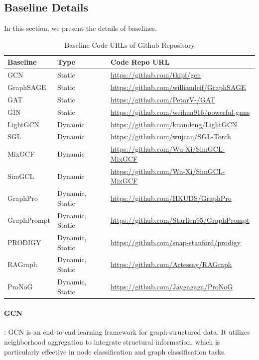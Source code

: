 \subsection{Baseline Details}

In this section, we present the details of baselines.

\begin{table}[h!]
\centering
\renewcommand{\arraystretch}{1.2}
\setlength{\tabcolsep}{8pt}
\footnotesize
\caption{Baseline Code URLs of Github Repository}
\label{tab:baseline_urls}
\begin{tabular}{l l l}
\toprule
\textbf{Baseline} & \textbf{Type} & \textbf{Code Repo URL} \\
\midrule
GCN              & Static        & \url{https://github.com/tkipf/gcn} \\
GraphSAGE        & Static        & \url{https://github.com/williamleif/GraphSAGE} \\
GAT              & Static        & \url{https://github.com/PetarV-/GAT} \\
GIN              & Static        & \url{https://github.com/weihua916/powerful-gnns} \\
LightGCN         & Dynamic       & \url{https://github.com/kuandeng/LightGCN} \\
SGL              & Dynamic       & \url{https://github.com/wujcan/SGL-Torch} \\
MixGCF           & Dynamic       & \url{https://github.com/Wu-Xi/SimGCL-MixGCF} \\
SimGCL           & Dynamic       & \url{https://github.com/Wu-Xi/SimGCL-MixGCF} \\
GraphPro         & Dynamic, Static & \url{https://github.com/HKUDS/GraphPro} \\
GraphPrompt      & Dynamic, Static & \url{https://github.com/Starlien95/GraphPrompt} \\
PRODIGY          & Dynamic, Static & \url{https://github.com/snap-stanford/prodigy} \\
RAGraph          & Dynamic, Static & \url{https://github.com/Artessay/RAGraph} \\
ProNoG          & Dynamic, Static & \url{https://github.com/Jaygagaga/ProNoG} \\
\bottomrule
\end{tabular}
\end{table}

\paragraph{GCN \cite{gcn_reference}}: GCN is an end-to-end learning framework for graph-structured data. It utilizes neighborhood aggregation to integrate structural information, which is particularly effective in node classification and graph classification tasks.


